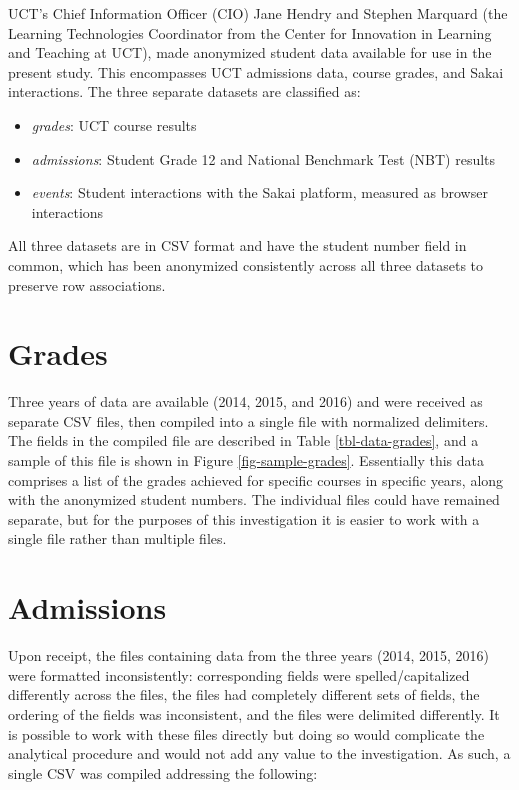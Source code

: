 UCT’s Chief Information Officer (CIO) Jane Hendry and Stephen Marquard (the Learning Technologies Coordinator from the Center for Innovation in Learning and Teaching at UCT), made anonymized student data available for use in the present study. This encompasses UCT admissions data, course grades, and Sakai interactions. The three separate datasets are classified as:

\begin{itemize}
    \item \textit{grades}: UCT course results
    \item \textit{admissions}: Student Grade 12 and National Benchmark Test (NBT) results
    \item \textit{events}: Student interactions with the Sakai platform, measured as browser interactions
\end{itemize}

All three datasets are in CSV format and have the student number field in common, which has been anonymized consistently across all three datasets to preserve row associations.

\section{Grades}
Three years of data are available (2014, 2015, and 2016) and were received as separate CSV files, then compiled into a single file with normalized delimiters. The fields in the compiled file are described in Table \ref{tbl-data-grades}, and a sample of this file is shown in Figure \ref{fig-sample-grades}. Essentially this data comprises a list of the grades achieved for specific courses in specific years, along with the anonymized student numbers. The individual files could have remained separate, but for the purposes of this investigation it is easier to work with a single file rather than multiple files.




\section{Admissions}
Upon receipt, the files containing data from the three years (2014, 2015, 2016) were formatted inconsistently: corresponding fields were spelled/capitalized differently across the files, the files had completely different sets of fields, the ordering of the fields was inconsistent, and the files were delimited differently. It is possible to work with these files directly but doing so would complicate the analytical procedure and would not add any value to the investigation. As such, a single CSV was compiled addressing the following:

